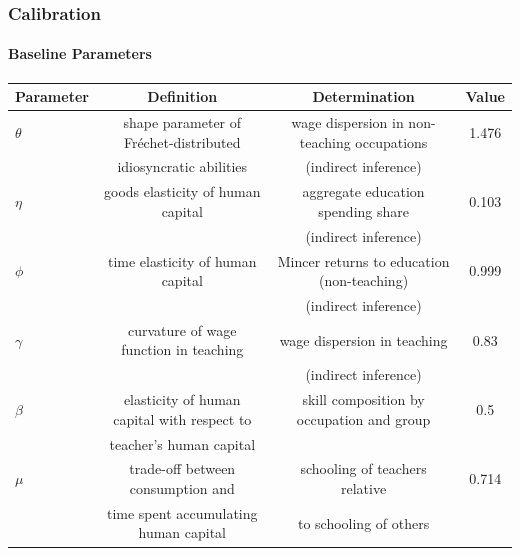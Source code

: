 \documentclass[11pt]{beamer}
\begin{document}
\begin{frame}
	\frametitle{Calibration}
	\framesubtitle{Baseline Parameters}
	\tiny
	\begin{table}[h!]
		\centering
		\begin{tabular}{lccc}
			\toprule
			Parameter & Definition & Determination & Value\\
			\midrule
			$\theta$ & shape parameter of Fr\'echet-distributed & wage dispersion in non-teaching occupations & 1.476\\
			& idiosyncratic abilities & (indirect inference) &\\
			$\eta$ & goods elasticity of human capital & aggregate education spending share  & 0.103\\
			& & (indirect inference) &\\
			$\phi$ & time elasticity of human capital & Mincer returns to education (non-teaching) & 0.999\\
			& & (indirect inference) &\\
			$\gamma$ & curvature of wage function in teaching & wage dispersion in teaching & 0.83\\
			&& (indirect inference) &\\
			\midrule
			$\beta$ & elasticity of human capital with respect to & skill composition by occupation and group & 0.5\\
			& teacher's human capital & &\\
			$\mu$ &  trade-off between consumption and & schooling of teachers relative & 0.714\\
			& time spent accumulating human capital & to schooling of others & \\
			\bottomrule
		\end{tabular}
		\label{tab:param}
	\end{table}
\end{frame}
\end{document}
